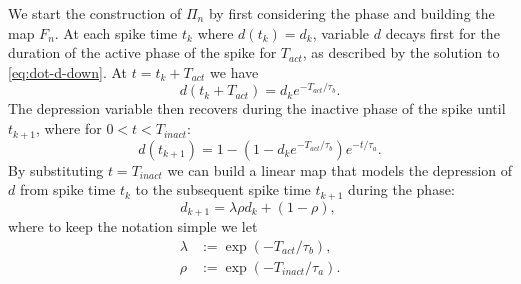 We start the construction of $\Pi_n$ by first considering the \free{} phase and building the map $F_n$.
At each spike time $t_{k}$ where $d(t_k) = d_k$, variable $d$ decays first for the duration of the active phase of the spike for $T_{act}$, as described by the solution to \cref{eq:dot-d-down}.
At $t = t_k + T_{act}$ we have
\begin{equation}
	d(t_k + T_{act}) = d_k e^{-T_{act}/\tau_b}.
\end{equation}
The depression variable then recovers during the inactive phase of the spike until $t_{k+1}$, where for $0<t<T_{inact}$:
\begin{equation}
	d(t_{k+1}) = 1 - (1 - d_k e^{-T_{act}/\tau_b} )e^{-t/\tau_a}.
\end{equation}
By substituting $t=T_{inact}$ we can build a linear map that models the depression of $d$ from spike time $t_{k}$ to the subsequent spike time $t_{k+1}$ during the \free{} phase:
\begin{equation}
	d_{k+1} = \lambda\rho d_{k} + (1-\rho),~\label{eq:map-d}
\end{equation}
where to keep the notation simple we let
\begin{align}
	\lambda & := \exp(-T_{act}/\tau_b), \label{eq:lambda} \\
	\rho    & :=\exp(-T_{inact}/\tau_{a}). \label{eq:rho}
\end{align}


